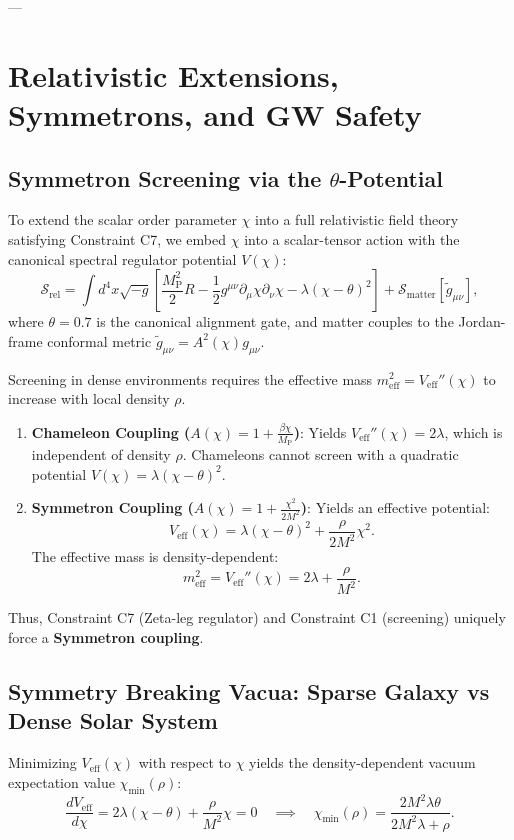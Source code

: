 \documentclass[11pt,a4paper]{article}
\theoremstyle{definition}
\begin{document}
---

\section{Relativistic Extensions, Symmetrons, and GW Safety}

\subsection{Symmetron Screening via the \texorpdfstring{$\theta$}{Theta}-Potential}
To extend the scalar order parameter $\chi$ into a full relativistic field theory satisfying Constraint C7, we embed $\chi$ into a scalar-tensor action with the canonical spectral regulator potential $V(\chi)$:
\begin{equation}
\mathcal{S}_{\text{rel}} = \int d^4x \sqrt{-g} \left[ \frac{M_{\text{P}}^2}{2} R - \frac{1}{2}g^{\mu\nu}\partial_\mu\chi\partial_\nu\chi - \lambda(\chi - \theta)^2 \right] + \mathcal{S}_{\text{matter}}[\tilde{g}_{\mu\nu}],
\end{equation}
where $\theta = 0.7$ is the canonical alignment gate, and matter couples to the Jordan-frame conformal metric $\tilde{g}_{\mu\nu} = A^2(\chi) g_{\mu\nu}$.

Screening in dense environments requires the effective mass $m_{\text{eff}}^2 = V_{\text{eff}}''(\chi)$ to increase with local density $\rho$. 
\begin{enumerate}
\item \textbf{Chameleon Coupling ($A(\chi) = 1 + \frac{\beta\chi}{M_{\text{P}}}$)}:
Yields $V_{\text{eff}}''(\chi) = 2\lambda$, which is independent of density $\rho$. Chameleons cannot screen with a quadratic potential $V(\chi) = \lambda(\chi - \theta)^2$.
\item \textbf{Symmetron Coupling ($A(\chi) = 1 + \frac{\chi^2}{2M^2}$)}:
Yields an effective potential:
\begin{equation}
V_{\text{eff}}(\chi) = \lambda(\chi - \theta)^2 + \frac{\rho}{2M^2} \chi^2.
\end{equation}
The effective mass is density-dependent:
\begin{equation}
m_{\text{eff}}^2 = V_{\text{eff}}''(\chi) = 2\lambda + \frac{\rho}{M^2}.
\end{equation}
\end{enumerate}
Thus, Constraint C7 (Zeta-leg regulator) and Constraint C1 (screening) uniquely force a \textbf{Symmetron coupling}.

\subsection{Symmetry Breaking Vacua: Sparse Galaxy vs Dense Solar System}
Minimizing $V_{\text{eff}}(\chi)$ with respect to $\chi$ yields the density-dependent vacuum expectation value $\chi_{\text{min}}(\rho)$:
\begin{equation}
\frac{d V_{\text{eff}}}{d\chi} = 2\lambda(\chi - \theta) + \frac{\rho}{M^2}\chi = 0 \quad \implies \quad \chi_{\text{min}}(\rho) = \frac{2 M^2 \lambda \theta}{2 M^2 \lambda + \rho}.
\label{eq:symmetron_vacua}
\end{equation}
\end{document}
